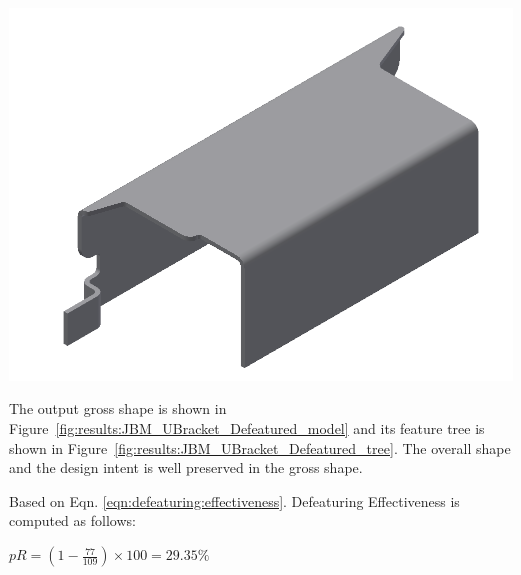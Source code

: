 \begin{minipage}{\linewidth}
\begin{minipage}[c]{0.62\linewidth}
\includegraphics[width=\linewidth,valign=t]{images/JBM_UBracket_Defeatured_model}
 \label{fig:results:JBM_UBracket_Defeatured_model}


The output gross shape is shown in Figure~\ref{fig:results:JBM_UBracket_Defeatured_model} and its feature tree is shown in Figure~\ref{fig:results:JBM_UBracket_Defeatured_tree}. The overall shape and the design intent is well preserved in the gross shape.

Based on Eqn. \ref{eqn:defeaturing:effectiveness}. Defeaturing Effectiveness is computed as follows:

$pR = (1 - \frac{77}{109}) \times 100 = 29.35\%$


\end{minipage}
\end{minipage}
